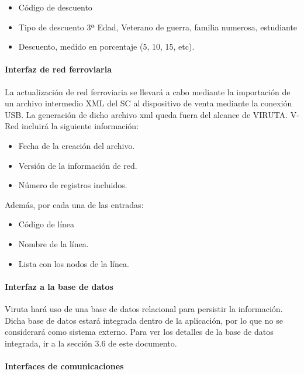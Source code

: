 \begin{itemize}
\item Código de descuento
\item Tipo de descuento { 3ª Edad, Veterano de guerra, familia numerosa, estudiante}
\item Descuento, medido en porcentaje (5, 10, 15, etc).
\end{itemize}

\paragraph{Interfaz de red ferroviaria}

La actualización de red ferroviaria se llevará a cabo mediante la importación de un archivo intermedio XML del SC al dispositivo de venta mediante la conexión USB. La generación de dicho archivo xml queda fuera del alcance de VIRUTA. V-Red incluirá la siguiente información:\\

\begin{itemize}
 \item Fecha de la creación del archivo.
 \item  Versión de la información de red.
 \item Número de registros incluidos.
\end{itemize}

Además, por cada una de las entradas:

 \begin{itemize}
 \item Código de línea
 \item Nombre de la línea.
 \item Lista con los nodos de la línea.
 \end{itemize}

\paragraph{Interfaz a la base de datos}

Viruta hará uso de una base de datos relacional para persistir la información. Dicha base de datos estará integrada dentro de la aplicación, por lo que no se considerará como sistema externo. Para ver los detalles de la base de datos integrada, ir a la sección 3.6 de este documento.

\paragraph{Interfaces de comunicaciones}

